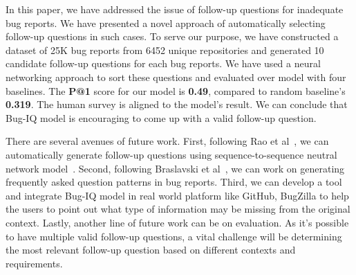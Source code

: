 In this paper, we have addressed the issue of follow-up questions for inadequate bug reports. We have presented a novel approach of automatically selecting follow-up questions in such cases. To serve our purpose, we have constructed a dataset of 25K bug reports from 6452 unique repositories and generated 10 candidate follow-up questions for each bug reports. We have used a neural networking approach to sort these questions and evaluated over model with four baselines. The \textbf{P@1} score for our model is \textbf{0.49}, compared to random baseline's \textbf{0.319}. The human survey is aligned to the model's result. We can conclude that Bug-IQ model is encouraging to come up with a valid follow-up question.

There are several avenues of future work. First, following Rao et al~\cite{rao2019answer}, we can automatically generate follow-up questions using sequence-to-sequence neutral network model~\cite{sutskever2014sequence, yin2015neural, serban2015building}. Second, following Braslavski et al~\cite{10.1145/3020165.3022149}, we can work on generating frequently asked question patterns in bug reports. Third, we can develop a tool and integrate Bug-IQ model in real world platform like GitHub, BugZilla to help the users to point out what type of information may be missing from the original context. Lastly, another line of future work can be on evaluation. As it's possible to have multiple valid follow-up questions, a vital challenge will be determining the most relevant follow-up question based on different contexts and requirements.
